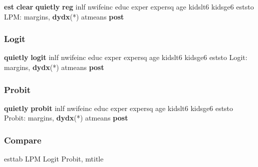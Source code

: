 \documentclass[
]{book}
\newenvironment{Shaded}{\begin{snugshade}}{\end{snugshade}}
\newcommand{\KeywordTok}[1]{\textcolor[rgb]{0.13,0.29,0.53}{\textbf{#1}}}
\newcommand{\NormalTok}[1]{#1}
\begin{document}
\begin{Shaded}
\begin{Highlighting}[]
\KeywordTok{est} \KeywordTok{clear}
\KeywordTok{quietly} \KeywordTok{reg}\NormalTok{ inlf nwifeinc educ exper expersq age kidslt6 kidsge6}
\NormalTok{eststo LPM: margins, }\KeywordTok{dydx}\NormalTok{(*) atmeans }\KeywordTok{post}
\end{Highlighting}
\end{Shaded}

\subsubsection*{Logit}\label{logit-1}

\begin{Shaded}
\begin{Highlighting}[]
\KeywordTok{quietly} \KeywordTok{logit}\NormalTok{ inlf nwifeinc educ exper expersq age kidslt6 kidsge6}
\NormalTok{eststo Logit: margins, }\KeywordTok{dydx}\NormalTok{(*) atmeans }\KeywordTok{post}
\end{Highlighting}
\end{Shaded}

\subsubsection*{Probit}\label{probit-1}

\begin{Shaded}
\begin{Highlighting}[]
\KeywordTok{quietly} \KeywordTok{probit}\NormalTok{ inlf nwifeinc educ exper expersq age kidslt6 kidsge6}
\NormalTok{eststo Probit: margins, }\KeywordTok{dydx}\NormalTok{(*) atmeans }\KeywordTok{post}
\end{Highlighting}
\end{Shaded}

\subsubsection*{Compare}\label{compare-1}

\begin{Shaded}
\begin{Highlighting}[]
\NormalTok{esttab LPM Logit Probit, mtitle }
\end{Highlighting}
\end{Shaded}
\end{document}

